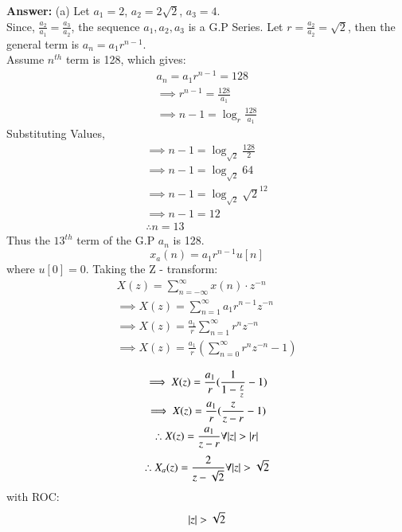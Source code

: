 \documentclass[journal,12pt,twocolumn]{IEEEtran}
\theoremstyle{remark}
\begin{document}
\textbf{Answer:} (a) Let $a_1 = 2$, $a_2 = 2\sqrt{2}$, $a_3 = 4$.\\
Since, $\frac{a_2}{a_1} = \frac{a_3}{a_2}$, the sequence $a_1, a_2, a_3$ is a G.P Series.
Let $r = \frac{a_2}{a_2} = \sqrt{2}$, then the general term is $a_n = a_1 r^{n-1}$.\\
Assume $n^{th}$ term is 128, which gives: 
\begin{gather*}
    a_n = a_1 r^{n-1} = 128\\
    \implies r^{n-1} = \frac{128}{a_1}\\
    \implies n - 1 = \log_{r}{\frac{128}{a_1}}
\end{gather*}
Substituting Values,
\begin{gather*}
    \implies n - 1 = \log_{\sqrt{2}}{\frac{128}{2}}\\
    \implies n - 1 = \log_{\sqrt{2}}{64}\\
    \implies n - 1 = \log_{\sqrt{2}}{\sqrt{2}^{12}}\\
    \implies n - 1 = 12\\
    \therefore n = 13
\end{gather*}
Thus the $13^{th}$ term of the G.P $a_n$ is 128.\\ 
\[ x_a(n) = a_1r^{n - 1}u[n] \] where $u[0] = 0$.
Taking the Z - transform:
\begin{gather*}
    X(z) = \sum_{n = -\infty}^{\infty}{x(n) \cdot z^{-n}}\\
    \implies X(z) = \sum_{n = 1}^{\infty}{a_1r^{n - 1}z^{-n}}\\
    \implies X(z) = \frac{a_1}{r}\sum_{n = 1}^{\infty}{r^n z^{-n}}\\
    \implies X(z) = \frac{a_1}{r}(\sum_{n = 0}^{\infty}{r^n z^{-n}} - 1)\\
\end{gather*}
\begin{gather*}
    \implies X(z) = \frac{a_1}{r}(\frac{1}{1 - \frac{r}{z}} - 1)\\
    \implies X(z) = \frac{a_1}{r}(\frac{z}{z - r} - 1)\\
    \therefore X(z) = \frac{a_1}{z - r}\forall { \left\vert z\right\vert > \left\vert r\right\vert}\\
\end{gather*}
\[\therefore X_a(z) = \frac{2}{z - \sqrt{2}}\forall { \left\vert z\right\vert > \sqrt{2}}\]
with ROC: \[{ \left\vert z\right\vert > \sqrt{2}}\]
\end{document}
